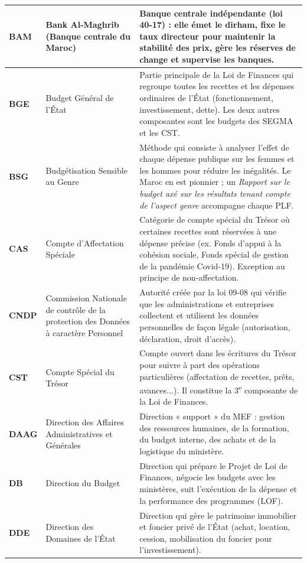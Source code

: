 {\begin{longtable}{|p{1.8cm}|p{4.9cm}|p{8.8cm}|}
\textbf{BAM} & Bank Al-Maghrib (Banque centrale du Maroc) & Banque centrale indépendante (loi 40-17) : elle émet le dirham, fixe le \textbf{taux directeur} pour maintenir la stabilité des prix, gère les réserves de change et supervise les banques. \\ \hline
\textbf{BGE} & Budget Général de l'État & Partie principale de la Loi de Finances qui regroupe toutes les recettes et les dépenses ordinaires de l'État (fonctionnement, investissement, dette). Les deux autres composantes sont les budgets des SEGMA et les CST. \\ \hline
\textbf{BSG} & Budgétisation Sensible au Genre & Méthode qui consiste à analyser l'effet de chaque dépense publique sur les femmes et les hommes pour réduire les inégalités. Le Maroc en est pionnier ; un \textit{Rapport sur le budget axé sur les résultats tenant compte de l'aspect genre} accompagne chaque PLF. \\ \hline
\textbf{CAS} & Compte d'Affectation Spéciale & Catégorie de compte spécial du Trésor où certaines recettes sont réservées à une dépense précise (ex. Fonds d'appui à la cohésion sociale, Fonds spécial de gestion de la pandémie Covid-19). Exception au principe de non-affectation. \\ \hline
\textbf{CNDP} & Commission Nationale de contrôle de la protection des Données à caractère Personnel & Autorité créée par la loi 09-08 qui vérifie que les administrations et entreprises collectent et utilisent les données personnelles de façon légale (autorisation, déclaration, droit d'accès). \\ \hline
\textbf{CST} & Compte Spécial du Trésor & Compte ouvert dans les écritures du Trésor pour suivre à part des opérations particulières (affectation de recettes, prêts, avances...). Il constitue la 3\textsuperscript{e} composante de la Loi de Finances. \\ \hline
\textbf{DAAG} & Direction des Affaires Administratives et Générales & Direction « support » du MEF : gestion des ressources humaines, de la formation, du budget interne, des achats et de la logistique du ministère. \\ \hline
\textbf{DB} & Direction du Budget & Direction qui prépare le Projet de Loi de Finances, négocie les budgets avec les ministères, suit l'exécution de la dépense et la performance des programmes (LOF). \\ \hline
\textbf{DDE} & Direction des Domaines de l'État & Direction qui gère le patrimoine immobilier et foncier privé de l'État (achat, location, cession, mobilisation du foncier pour l'investissement). \\ \hline

\end{longtable}}
